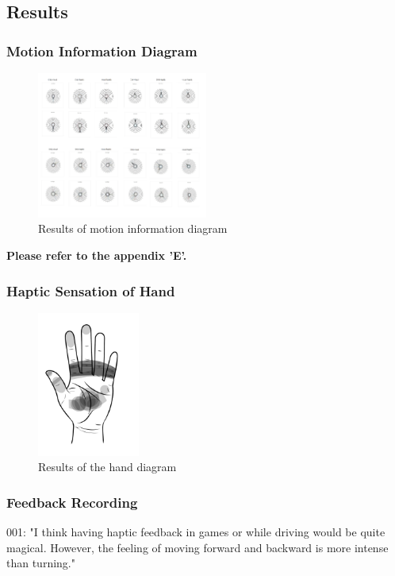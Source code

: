 \subsection{Results}
\subsubsection{Motion Information Diagram}
\begin{figure}[h]
\centering
\includegraphics[width=0.5\textwidth]{A_thesis/figures/039.png}
\caption{Results of motion information diagram}
\end{figure}

\textbf{Please refer to the appendix 'E'.}


\subsubsection{Haptic Sensation of Hand}

\begin{figure}[h]
\centering
\includegraphics[width=0.3\textwidth]{A_thesis/figures/016.png}
\caption{Results of the hand diagram}
\end{figure}



\subsubsection{Feedback Recording}
001: "I think having haptic feedback in games or while driving would be quite magical. However, the feeling of moving forward and backward is more intense than turning."

